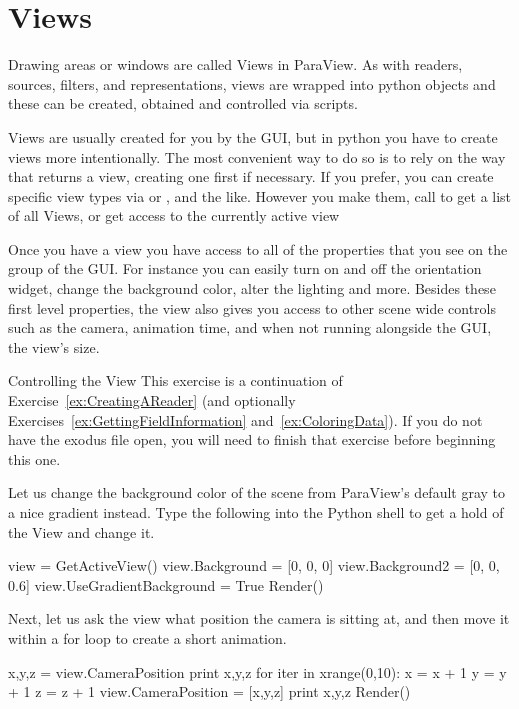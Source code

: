 \section{Views}
\label{sec:Views}

Drawing areas or windows are called Views in ParaView.
As with readers, sources, filters, and representations, views are wrapped
into python objects and these can be created, obtained and controlled via scripts.

Views are usually created for you by the GUI, but in python you have to
create views more intentionally.  The most convenient way to do so is to
rely on the way that  returns a view, creating one first if
necessary.  If you prefer, you can create specific view types via
 or ,
 and the like.  However you make them, call
 to get a list of all Views, or
 get access to the currently active view

Once you have a view you have access to all of the properties that you see on
the  group of the GUI. For instance you can easily turn on and off the orientation widget, change the background color, alter the lighting and more.
Besides these first level properties, the view also gives you access to other scene wide controls such as the camera, animation time, and when not running alongside the GUI, the view's size.

\begin{exercise}{Controlling the View}
  \label{ex:ControlView}%
  This exercise is a continuation of Exercise~\ref{ex:CreatingAReader} (and
  optionally Exercises~\ref{ex:GettingFieldInformation}
  and~\ref{ex:ColoringData}).
  If you do not have the exodus file open, you will need to finish that
  exercise before beginning this one.

  Let us change the background color of the scene from ParaView's default gray 
  to a nice gradient instead. Type the following into the Python shell
  to get a hold of the View and change it.

  \begin{python}
view = GetActiveView()
view.Background = [0, 0, 0]
view.Background2 = [0, 0, 0.6]
view.UseGradientBackground = True
Render()
  \end{python}

  Next, let us ask the view what position the camera is sitting at, and
  then move it within a for loop to create a short animation.
  \begin{python}
x,y,z = view.CameraPosition
print x,y,z
for iter in xrange(0,10):
  x = x + 1
  y = y + 1
  z = z + 1
  view.CameraPosition = [x,y,z]
  print x,y,z
  Render()
  \end{python}

\end{exercise}


